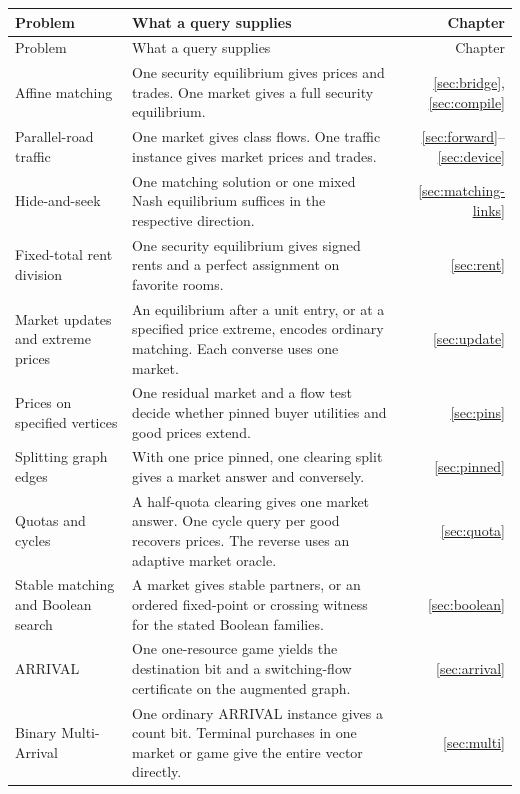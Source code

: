 \documentclass[11pt,oneside,openany,notitlepage]{report}
\begin{document}
\begin{longtable}{@{}>{\raggedright\arraybackslash}p{.31\linewidth}@{\hspace{.03\linewidth}}>{\raggedright\arraybackslash}p{.50\linewidth}@{\hspace{.03\linewidth}}r@{}}
\toprule
Problem & What a query supplies & Chapter\\ \midrule
\endfirsthead
\toprule Problem & What a query supplies & Chapter\\ \midrule
\endhead
\bottomrule\endfoot
Affine matching & One security equilibrium gives prices and trades. One market gives a full security equilibrium. & \ref{sec:bridge}, \ref{sec:compile}\\
Parallel-road traffic & One market gives class flows. One traffic instance gives market prices and trades. & \ref{sec:forward}--\ref{sec:device}\\
Hide-and-seek & One matching solution or one mixed Nash equilibrium suffices in the respective direction. & \ref{sec:matching-links}\\
Fixed-total rent division & One security equilibrium gives signed rents and a perfect assignment on favorite rooms. & \ref{sec:rent}\\
Market updates and extreme prices & An equilibrium after a unit entry, or at a specified price extreme, encodes ordinary matching. Each converse uses one market. & \ref{sec:update}\\
Prices on specified vertices & One residual market and a flow test decide whether pinned buyer utilities and good prices extend. & \ref{sec:pins}\\
Splitting graph edges & With one price pinned, one clearing split gives a market answer and conversely. & \ref{sec:pinned}\\
Quotas and cycles & A half-quota clearing gives one market answer. One cycle query per good recovers prices. The reverse uses an adaptive market oracle. & \ref{sec:quota}\\
Stable matching and Boolean search & A market gives stable partners, or an ordered fixed-point or crossing witness for the stated Boolean families. & \ref{sec:boolean}\\
ARRIVAL & One one-resource game yields the destination bit and a switching-flow certificate on the augmented graph. & \ref{sec:arrival}\\
Binary Multi-Arrival & One ordinary ARRIVAL instance gives a count bit. Terminal purchases in one market or game give the entire vector directly. & \ref{sec:multi}\\

\end{longtable}
\end{document}
